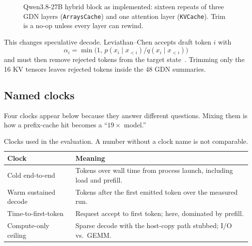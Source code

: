 \begin{figure}[t]
\centering
{}
\caption{Qwen3.8-27B hybrid block as implemented: sixteen repeats of three GDN layers (\texttt{ArraysCache}) and one attention layer (\texttt{KVCache}). Trim is a no-op unless every layer can rewind.}
\label{fig:hybrid}
\end{figure}

This changes speculative decode. Leviathan--Chen accepts draft token $i$ with
\begin{equation}
\alpha_i = \min\bigl(1,\, p(x_i\mid x_{<i}) / q(x_i\mid x_{<i})\bigr)
\label{eq:alpha}
\end{equation}
and must then remove rejected tokens from the target state~\citep{leviathan2023speculative,chen2023accelerating}. Trimming only the 16 KV tensors leaves rejected tokens inside the 48 GDN summaries.

\subsection{Named clocks}
\label{sec:clocks}

Four clocks appear below because they answer different questions. Mixing them is how a prefix-cache hit becomes a ``$19{\times}$ model.''

\begin{table}[t]
\centering
\caption{Clocks used in the evaluation. A number without a clock name is not comparable.}
\label{tab:clocks}
\small
\begin{tabular}{@{}p{3.6cm}p{10.2cm}@{}}
\toprule
Clock & Meaning \\
\midrule
Cold end-to-end & Tokens over wall time from process launch, including load and prefill. \\
Warm sustained decode & Tokens after the first emitted token over the measured run. \\
Time-to-first-token & Request accept to first token; here, dominated by prefill. \\
Compute-only ceiling & Sparse decode with the host-copy path stubbed; I/O vs.\ GEMM. \\
\bottomrule
\end{tabular}
\end{table}

